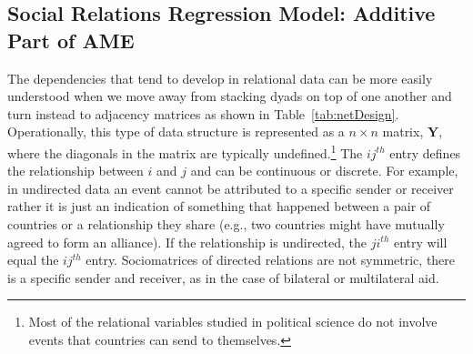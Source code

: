 \documentclass[12pt,pdflatex]{elsarticle}
\begin{document}
\subsection{Social Relations Regression Model: Additive Part of AME}

The dependencies that tend to develop in relational data can be more easily understood when we move away from stacking dyads on top of one another and turn instead to adjacency matrices as shown in Table~\ref{tab:netDesign}. Operationally, this type of data structure is represented as a $n \times n$ matrix, $\mathbf{Y}$, where the diagonals in the matrix are typically undefined.\footnote{Most of the relational variables studied in political science do not involve events that countries can send to themselves.} The $ij^{th}$ entry defines the relationship between $i$ and $j$ and can be continuous or discrete. For example, in undirected data an event cannot be attributed to a specific sender or receiver rather it is just an indication of something that happened between a pair of countries or a relationship they share (e.g., two countries might have mutually agreed to form an alliance). If the relationship is undirected, the $ji^{th}$ entry will equal the $ij^{th}$ entry. Sociomatrices of directed relations are not symmetric, there is a specific sender and receiver, as in the case of bilateral or multilateral aid.
\end{document}
